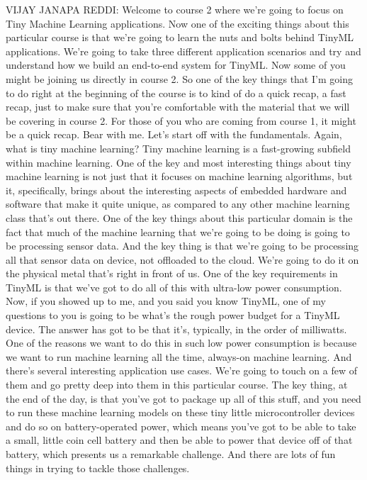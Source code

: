 VIJAY JANAPA REDDI: Welcome to course 2 where
we're going to focus on Tiny Machine Learning applications.
Now one of the exciting things about this particular course
is that we're going to learn the nuts and bolts behind TinyML applications.
We're going to take three different application scenarios
and try and understand how we build an end-to-end system for TinyML.
Now some of you might be joining us directly in course 2.
So one of the key things that I'm going to do right
at the beginning of the course is to kind of do a quick recap, a fast recap,
just to make sure that you're comfortable with the material
that we will be covering in course 2.
For those of you who are coming from course 1, it might be a quick recap.
Bear with me.
Let's start off with the fundamentals.
Again, what is tiny machine learning?
Tiny machine learning is a fast-growing subfield within machine learning.
One of the key and most interesting things about tiny machine learning
is not just that it focuses on machine learning algorithms,
but it, specifically, brings about the interesting aspects
of embedded hardware and software that make it quite unique,
as compared to any other machine learning class that's out there.
One of the key things about this particular domain
is the fact that much of the machine learning that we're going to be doing
is going to be processing sensor data.
And the key thing is that we're going to be processing all that sensor data
on device, not offloaded to the cloud.
We're going to do it on the physical metal that's right in front of us.
One of the key requirements in TinyML is that we've
got to do all of this with ultra-low power consumption.
Now, if you showed up to me, and you said you know TinyML,
one of my questions to you is going to be what's the rough power
budget for a TinyML device.
The answer has got to be that it's, typically, in the order of milliwatts.
One of the reasons we want to do this in such low power consumption
is because we want to run machine learning all
the time, always-on machine learning.
And there's several interesting application use cases.
We're going to touch on a few of them and go pretty deep into them
in this particular course.
The key thing, at the end of the day, is that you've
got to package up all of this stuff, and you
need to run these machine learning models
on these tiny little microcontroller devices
and do so on battery-operated power, which
means you've got to be able to take a small, little coin cell battery
and then be able to power that device off of that battery, which presents us
a remarkable challenge.
And there are lots of fun things in trying to tackle those challenges.
